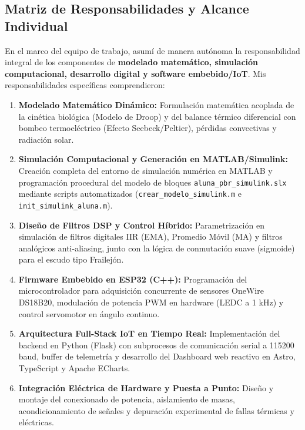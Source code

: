 \subsection{Matriz de Responsabilidades y Alcance Individual}
En el marco del equipo de trabajo, asumí de manera autónoma la responsabilidad integral de los componentes de \textbf{modelado matemático, simulación computacional, desarrollo digital y software embebido/IoT}. Mis responsabilidades específicas comprendieron:

\begin{enumerate}[label=\textbf{\arabic*.}]
    \item \textbf{Modelado Matemático Dinámico:} Formulación matemática acoplada de la cinética biológica (Modelo de Droop) y del balance térmico diferencial con bombeo termoeléctrico (Efecto Seebeck/Peltier), pérdidas convectivas y radiación solar.
    \item \textbf{Simulación Computacional y Generación en MATLAB/Simulink:} Creación completa del entorno de simulación numérica en MATLAB y programación procedural del modelo de bloques \texttt{aluna\_pbr\_simulink.slx} mediante scripts automatizados (\texttt{crear\_modelo\_simulink.m} e \texttt{init\_simulink\_aluna.m}).
    \item \textbf{Diseño de Filtros DSP y Control Híbrido:} Parametrización en simulación de filtros digitales IIR (EMA), Promedio Móvil (MA) y filtros analógicos anti-aliasing, junto con la lógica de conmutación suave (sigmoide) para el escudo tipo Frailejón.
    \item \textbf{Firmware Embebido en ESP32 (C++):} Programación del microcontrolador para adquisición concurrente de sensores OneWire DS18B20, modulación de potencia PWM en hardware (LEDC a 1 kHz) y control servomotor en ángulo continuo.
    \item \textbf{Arquitectura Full-Stack IoT en Tiempo Real:} Implementación del backend en Python (Flask) con subprocesos de comunicación serial a 115200 baud, buffer de telemetría y desarrollo del Dashboard web reactivo en Astro, TypeScript y Apache ECharts.
    \item \textbf{Integración Eléctrica de Hardware y Puesta a Punto:} Diseño y montaje del conexionado de potencia, aislamiento de masas, acondicionamiento de señales y depuración experimental de fallas térmicas y eléctricas.
\end{enumerate}
